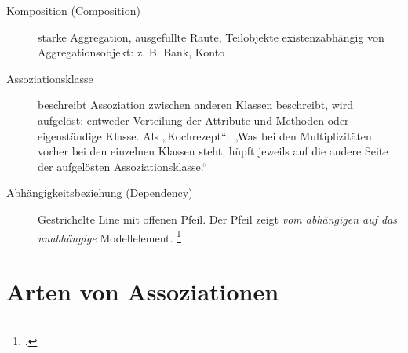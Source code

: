 \documentclass{lehramt-informatik}
\begin{document}
\begin{description}
%

\item[Komposition (Composition)]
starke Aggregation, ausgefüllte Raute, Teilobjekte existenzabhängig von
Aggregationsobjekt: z. B. Bank, Konto


\item[Assoziationsklasse]
beschreibt Assoziation zwischen anderen Klassen beschreibt, wird
aufgelöst: entweder Verteilung der Attribute und Methoden oder
eigenständige Klasse. Als „Kochrezept“: „Was bei den Multiplizitäten
vorher bei den einzelnen Klassen steht, hüpft jeweils auf die andere
Seite der aufgelösten Assoziationsklasse.“

\item[Abhängigkeitsbeziehung (Dependency)]

Gestrichelte Line mit offenen Pfeil. Der Pfeil zeigt \emph{vom
abhängigen auf das unabhängige} Modellelement. 
\footcite[Kapitel 6.4.10 Abhängigkeitsbeziehung, Seite 159]{rupp}

\end{description}

%

\section{Arten von Assoziationen}
\end{document}
